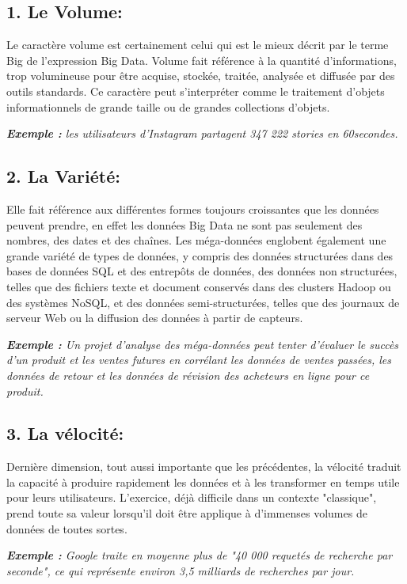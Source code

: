 \subsection*{1. Le Volume:}
Le caractère volume est certainement celui qui est le mieux décrit par le terme Big de l'expression Big Data. Volume fait référence à la quantité d'informations, trop volumineuse pour être acquise, stockée, traitée, analysée et diffusée par des outils standards. Ce caractère peut s'interpréter comme le traitement d'objets informationnels de grande taille ou de grandes collections d'objets.

\textit{\textbf{Exemple :} les utilisateurs d'Instagram partagent 347 222 stories en 60secondes.}

\subsection*{2. La Variété:}
Elle fait référence aux différentes formes toujours croissantes que les données peuvent prendre, en effet les données Big Data ne sont pas seulement des nombres, des dates et des chaînes. Les méga-données englobent également une grande variété de types de données, y compris des données structurées dans des bases de données SQL et des entrepôts de données, des données non structurées, telles que des fichiers texte et document conservés dans des clusters Hadoop ou des systèmes NoSQL, et des données semi-structurées, telles que des journaux de serveur Web ou la diffusion des données à partir de capteurs.

\textit{\textbf{Exemple :} Un projet d'analyse des méga-données peut tenter d'évaluer le succès d'un produit et les ventes futures en corrélant les données de ventes passées, les données de retour et les données de révision des acheteurs en ligne pour ce produit.}

\subsection*{3. La vélocité:}
Dernière dimension, tout aussi importante que les précédentes, la vélocité traduit la capacité à produire rapidement les données et à les transformer en temps utile pour leurs utilisateurs. L'exercice, déjà difficile dans un contexte "classique", prend toute sa valeur lorsqu'il doit être applique à d'immenses volumes de données de toutes sortes.

\textit{\textbf{Exemple :} Google traite en moyenne plus de "40 000 requetés de recherche par seconde", ce qui représente environ 3,5 milliards de recherches par jour.}

